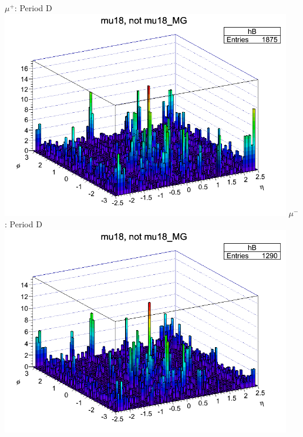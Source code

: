  {
\colb[T]
$\mu^+$: Period D
\centering
\includegraphics[width=0.95\textwidth]{dates/20130306/figures/mu18/dump_MG_dataD_w_POS.dat__MUID_NOT_MG.png}
$\mu^-$: Period D
\centering
\includegraphics[width=0.95\textwidth]{dates/20130306/figures/mu18/dump_MG_dataD_w_NEG.dat__MUID_NOT_MG.png}
\cole
}
